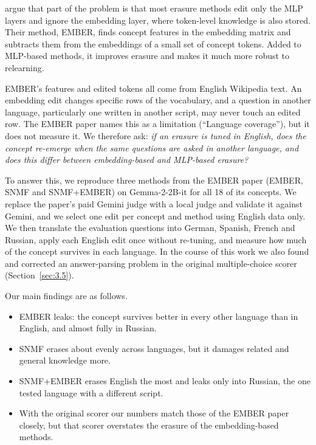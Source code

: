 \documentclass[11pt]{article}
\begin{document}
\citet{suslik2026ember} argue that part of the problem is that most erasure methods edit only the MLP layers and ignore the embedding layer, where token-level knowledge is also stored. Their method, EMBER, finds concept features in the embedding matrix and subtracts them from the embeddings of a small set of concept tokens. Added to MLP-based methods, it improves erasure and makes it much more robust to relearning.

EMBER's features and edited tokens all come from English Wikipedia text. An embedding edit changes specific rows of the vocabulary, and a question in another language, particularly one written in another script, may never touch an edited row. The EMBER paper names this as a limitation (``Language coverage''), but it does not measure it. We therefore ask: \emph{if an erasure is tuned in English, does the concept re-emerge when the same questions are asked in another language, and does this differ between embedding-based and MLP-based erasure?}

To answer this, we reproduce three methods from the EMBER paper (EMBER, SNMF and SNMF+EMBER) on Gemma-2-2B-it for all 18 of its concepts. We replace the paper's paid Gemini judge with a local judge and validate it against Gemini, and we select one edit per concept and method using English data only. We then translate the evaluation questions into German, Spanish, French and Russian, apply each English edit once without re-tuning, and measure how much of the concept survives in each language. In the course of this work we also found and corrected an answer-parsing problem in the original multiple-choice scorer (Section~\ref{sec:3.5}).

Our main findings are as follows.

\begin{itemize}
\setlength\itemsep{1pt}
\item EMBER leaks: the concept survives better in every other language than in English, and almost fully in Russian.
\item SNMF erases about evenly across languages, but it damages related and general knowledge more.
\item SNMF+EMBER erases English the most and leaks only into Russian, the one tested language with a different script.
\item With the original scorer our numbers match those of the EMBER paper closely, but that scorer overstates the erasure of the embedding-based methods.
\end{itemize}
\end{document}

